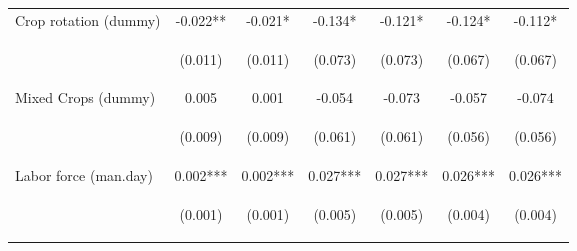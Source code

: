 \begin{center}
\begin{tabular}{lcccccc}
Crop rotation (dummy) & -0.022** & -0.021* & -0.134* & -0.121* & -0.124* & -0.112* \\
\vspace{4pt} & \begin{footnotesize}(0.011)\end{footnotesize} & \begin{footnotesize}(0.011)\end{footnotesize} & \begin{footnotesize}(0.073)\end{footnotesize} & \begin{footnotesize}(0.073)\end{footnotesize} & \begin{footnotesize}(0.067)\end{footnotesize} & \begin{footnotesize}(0.067)\end{footnotesize} \\
Mixed Crops (dummy) & 0.005 & 0.001 & -0.054 & -0.073 & -0.057 & -0.074 \\
\vspace{4pt} & \begin{footnotesize}(0.009)\end{footnotesize} & \begin{footnotesize}(0.009)\end{footnotesize} & \begin{footnotesize}(0.061)\end{footnotesize} & \begin{footnotesize}(0.061)\end{footnotesize} & \begin{footnotesize}(0.056)\end{footnotesize} & \begin{footnotesize}(0.056)\end{footnotesize} \\
Labor force (man.day) & 0.002*** & 0.002*** & 0.027*** & 0.027*** & 0.026*** & 0.026*** \\
\vspace{4pt} & \begin{footnotesize}(0.001)\end{footnotesize} & \begin{footnotesize}(0.001)\end{footnotesize} & \begin{footnotesize}(0.005)\end{footnotesize} & \begin{footnotesize}(0.005)\end{footnotesize} & \begin{footnotesize}(0.004)\end{footnotesize} & \begin{footnotesize}(0.004)\end{footnotesize} \\

\end{tabular}
\end{center}
